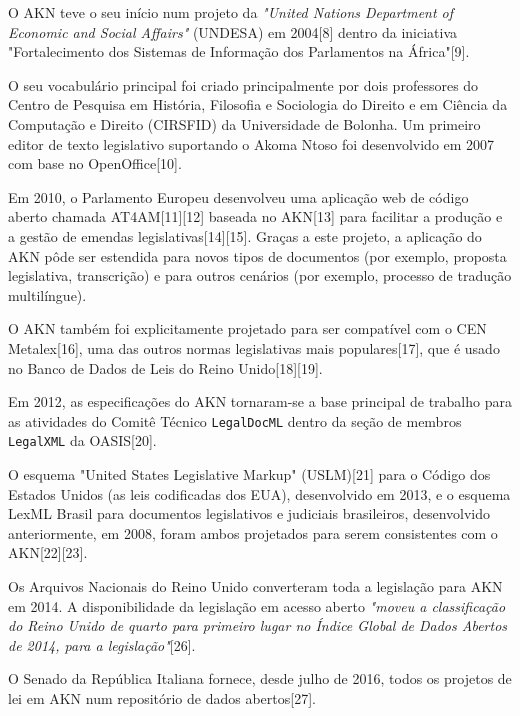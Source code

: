 O AKN teve o seu início num projeto da \emph{"United Nations Department of Economic and Social Affairs"} (UNDESA) 
em 2004[8] dentro da iniciativa "Fortalecimento dos Sistemas de Informação dos Parlamentos na África"[9]. 

O seu vocabulário principal foi criado principalmente por dois professores do Centro de Pesquisa em História, Filosofia e 
Sociologia do Direito e em Ciência da Computação e Direito (CIRSFID) da Universidade de Bolonha. 
Um primeiro editor de texto legislativo suportando o Akoma Ntoso foi desenvolvido em 2007 com base no OpenOffice[10].

Em 2010, o Parlamento Europeu desenvolveu uma aplicação web de código aberto chamada AT4AM[11][12] baseada no AKN[13] 
para facilitar a produção e a gestão de emendas legislativas[14][15]. 
Graças a este projeto, a aplicação do AKN pôde ser estendida para novos tipos de documentos (por exemplo, 
proposta legislativa, transcrição) e para outros cenários (por exemplo, processo de tradução multilíngue).

O AKN também foi explicitamente projetado para ser compatível com o CEN Metalex[16], uma das outros normas legislativas 
mais populares[17], que é usado no Banco de Dados de Leis do Reino Unido[18][19].

Em 2012, as especificações do AKN tornaram-se a base principal de trabalho para as atividades do Comitê Técnico 
\texttt{LegalDocML} dentro da seção de membros \texttt{LegalXML} da OASIS[20].

O esquema "United States Legislative Markup" (USLM)[21] para o Código dos Estados Unidos (as leis codificadas dos EUA), 
desenvolvido em 2013, e o esquema LexML Brasil para documentos legislativos e judiciais brasileiros, desenvolvido anteriormente, 
em 2008, foram ambos projetados para serem consistentes com o AKN[22][23].

Os Arquivos Nacionais do Reino Unido converteram toda a legislação para AKN em 2014. 
A disponibilidade da legislação em acesso aberto \emph{"moveu a classificação do Reino Unido de quarto para primeiro lugar no Índice Global 
de Dados Abertos de 2014, para a legislação"}[26].

O Senado da República Italiana fornece, desde julho de 2016, todos os projetos de lei em AKN num repositório de dados abertos[27].


